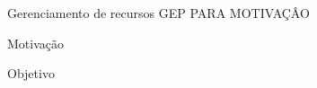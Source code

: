 \begin{frame}{Gerenciamento de recursos}
	GEP PARA MOTIVAÇÂO
\end{frame}	

\begin{frame}{Motivação}

\end{frame}	

\begin{frame}{Objetivo}
	
\end{frame}	